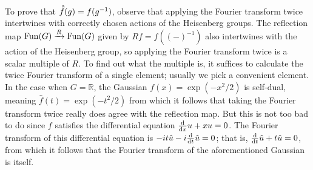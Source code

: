 \documentclass[../../rtnotes.tex]{subfiles}
\begin{document}
To prove that $~\dhat{\!\!f}(g) = f(g^{-1})$, observe that applying the Fourier transform twice intertwines with correctly chosen actions of the Heisenberg groups. The reflection map $\operatorname{Fun}(G)\xrightarrow{R}\operatorname{Fun}(G)$ given by $Rf = f((-)^{-1})$ also intertwines with the action of the Heisenberg group, so applying the Fourier transform twice is a scalar multiple of $R$. To find out what the multiple is, it suffices to calculate the twice Fourier transform of a single element; usually we pick a convenient element. In the case when $G = \mathbb R$, the Gaussian $f(x) = \exp(-x^2/2)$ is self-dual, meaning $\hat f(t) = \exp(-t^2/2)$ from which it follows that taking the Fourier transform twice really does agree with the reflection map. But this is not too bad to do since $f$ satisfies the differential equation $\dv{x}u+xu = 0$. The Fourier transform of this differential equation is $-it\hat u - i\dv{t}\hat u = 0$; that is, $\dv{t}\hat u+t\hat u = 0$, from which it follows that the Fourier transform of the aforementioned Gaussian is itself.
\end{document}

